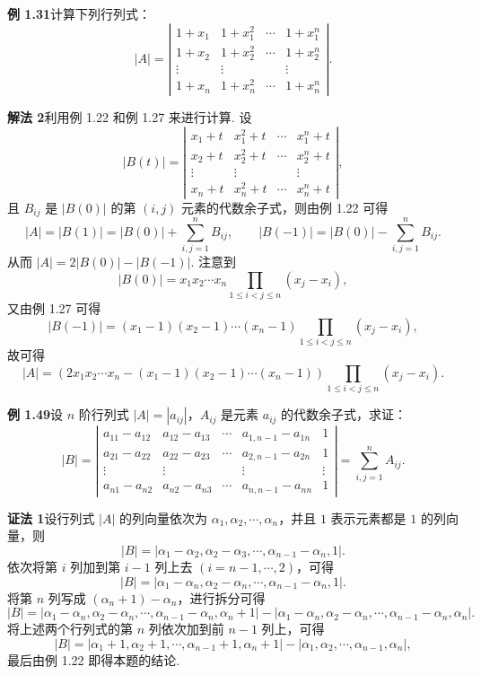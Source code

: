 \documentclass[UTF8, 12pt, fontset=fandol, oneside]{ctexart}
\begin{document}
\noindent\textbf{例 1.31}\quad 计算下列行列式：
\[
|A|=\left|\begin{array}{cccc}
1+x_1 & 1+x_1^2 & \cdots & 1+x_1^n\\
1+x_2 & 1+x_2^2 & \cdots & 1+x_2^n\\
\vdots & \vdots &        & \vdots\\
1+x_n & 1+x_n^2 & \cdots & 1+x_n^n
\end{array}\right|.
\]

\noindent\textbf{解法 2}\quad 利用例 1.22 和例 1.27 来进行计算. 设
\[
|B(t)|=\left|\begin{array}{cccc}
x_1+t & x_1^2+t & \cdots & x_1^n+t\\
x_2+t & x_2^2+t & \cdots & x_2^n+t\\
\vdots & \vdots &        & \vdots\\
x_n+t & x_n^2+t & \cdots & x_n^n+t
\end{array}\right|,
\]
且 $B_{ij}$ 是 $|B(0)|$ 的第 $(i,j)$ 元素的代数余子式，则由例 1.22 可得
\[
|A|=|B(1)|=|B(0)|+\sum_{i,j=1}^n B_{ij},\qquad
|B(-1)|=|B(0)|-\sum_{i,j=1}^n B_{ij}.
\]
从而 $|A|=2|B(0)|-|B(-1)|$. 注意到
\[
|B(0)|=x_1x_2\cdots x_n\prod_{1\le i<j\le n}(x_j-x_i),
\]
又由例 1.27 可得
\[
|B(-1)|=(x_1-1)(x_2-1)\cdots(x_n-1)\prod_{1\le i<j\le n}(x_j-x_i),
\]
故可得
\[
|A|=\left(2x_1x_2\cdots x_n-(x_1-1)(x_2-1)\cdots(x_n-1)\right)
\prod_{1\le i<j\le n}(x_j-x_i).
\]

\noindent\textbf{例 1.49}\quad 设 $n$ 阶行列式 $|A|=|a_{ij}|$，$A_{ij}$ 是元素 $a_{ij}$ 的代数余子式，求证：
\[
|B|=\left|\begin{array}{ccccc}
a_{11}-a_{12} & a_{12}-a_{13} & \cdots & a_{1,n-1}-a_{1n} & 1\\
a_{21}-a_{22} & a_{22}-a_{23} & \cdots & a_{2,n-1}-a_{2n} & 1\\
\vdots & \vdots &        & \vdots & \vdots\\
a_{n1}-a_{n2} & a_{n2}-a_{n3} & \cdots & a_{n,n-1}-a_{nn} & 1
\end{array}\right|
=\sum_{i,j=1}^n A_{ij}.
\]

\noindent\textbf{证法 1}\quad 设行列式 $|A|$ 的列向量依次为 $\alpha_1,\alpha_2,\cdots,\alpha_n$，并且 $1$ 表示元素都是 $1$ 的列向量，则
\[
|B|=|\alpha_1-\alpha_2,\alpha_2-\alpha_3,\cdots,\alpha_{n-1}-\alpha_n,1|.
\]
依次将第 $i$ 列加到第 $i-1$ 列上去 $(i=n-1,\cdots,2)$，可得
\[
|B|=|\alpha_1-\alpha_n,\alpha_2-\alpha_n,\cdots,\alpha_{n-1}-\alpha_n,1|.
\]
将第 $n$ 列写成 $(\alpha_n+1)-\alpha_n$，进行拆分可得
\[
|B|=|\alpha_1-\alpha_n,\alpha_2-\alpha_n,\cdots,\alpha_{n-1}-\alpha_n,\alpha_n+1|
-|\alpha_1-\alpha_n,\alpha_2-\alpha_n,\cdots,\alpha_{n-1}-\alpha_n,\alpha_n|.
\]
将上述两个行列式的第 $n$ 列依次加到前 $n-1$ 列上，可得
\[
|B|=|\alpha_1+1,\alpha_2+1,\cdots,\alpha_{n-1}+1,\alpha_n+1|-|\alpha_1,\alpha_2,\cdots,\alpha_{n-1},\alpha_n|,
\]
最后由例 1.22 即得本题的结论.
\end{document}

